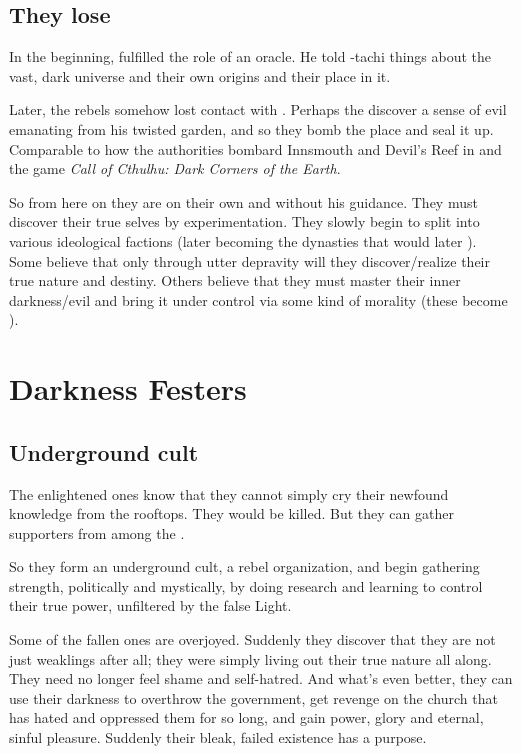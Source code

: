 \subsection[{They lose Semiza}]{They lose \Semiza}
In the beginning, \Semiza fulfilled the role of an oracle. 
He told \Damiarch-tachi things about the vast, dark universe and their own origins and their place in it.

Later, the rebels somehow lost contact with \Semiza. 
Perhaps the \Merkyrans{} discover a sense of evil emanating from his twisted garden, and so they bomb the place and seal it up. 
Comparable to how the authorities bombard Innsmouth and Devil's Reef in  and the game \emph{Call of Cthulhu: Dark Corners of the Earth}. 

So from here on they are on their own and without his guidance. 
They must discover their true selves by experimentation. 
They slowly begin to split into various ideological factions (later becoming the dynasties that would later ). 
Some believe that only through utter depravity will they discover/realize their true nature and destiny. 
Others believe that they must master their inner darkness/evil and bring it under control via some kind of morality (these become \CiriathSepher). 















\section{Darkness Festers}
\subsection{Underground cult}
The enlightened ones know that they cannot simply cry their newfound knowledge from the rooftops. They would be killed. But they can gather supporters from among the . 

So they form an underground cult, a rebel organization, and begin gathering strength, politically and mystically, by doing research and learning to control their true power, unfiltered by the false Light. 

Some of the fallen ones are overjoyed. Suddenly they discover that they are not just weaklings after all; they were simply living out their true nature all along. They need no longer feel shame and self-hatred. And what's even better, they can use their darkness to overthrow the government, get revenge on the church that has hated and oppressed them for so long, and gain power, glory and eternal, sinful pleasure. Suddenly their bleak, failed existence has a purpose. 


